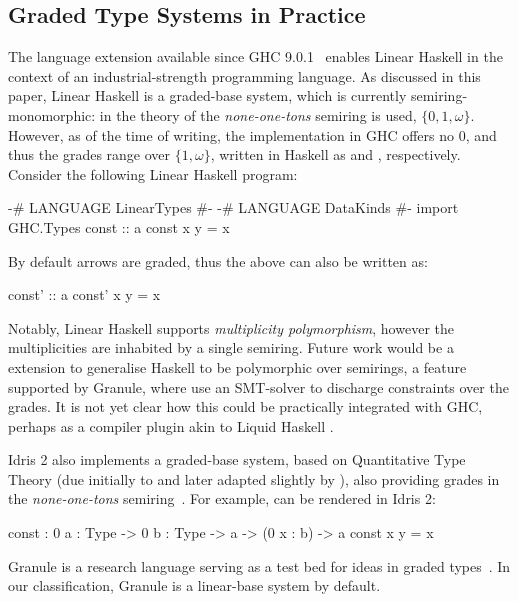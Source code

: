 \subsection{Graded Type Systems in Practice}
\label{sec:wild}
The  language extension available since GHC 9.0.1~\cite{GHCLinearTypes}
enables Linear Haskell in the context of an
industrial-strength programming language. As discussed in this paper, Linear Haskell is a graded-base system, which is currently semiring-monomorphic: in the theory
of \citet{DBLP:journals/pacmpl/BernardyBNJS18} the \textit{none-one-tons} semiring is used,
$\{0, 1, \omega\}$. However, as of the time of writing,
the implementation in GHC offers no $0$, and
thus the grades range over $\{1, \omega\}$, written in Haskell as  and , respectively.
Consider the following Linear Haskell program:
%
\begin{haskell}
{-# LANGUAGE LinearTypes #-}
{-# LANGUAGE DataKinds #-}
import GHC.Types
const :: a %
const x y = x
\end{haskell}
%
By default arrows are  graded, thus the above can also be written
as:
%
\begin{haskell}[firstnumber=last]
const' :: a %
const' x y = x
\end{haskell}
%
Notably, Linear Haskell supports \textit{multiplicity polymorphism}, however the multiplicities
are inhabited by a single semiring.
Future work would be a  extension to generalise Haskell to be polymorphic over
semirings, a feature supported by Granule, where \citet{DBLP:journals/pacmpl/OrchardLE19} use an
SMT-solver to discharge constraints over the grades. It is not yet clear how this could be
practically integrated with GHC, perhaps as a compiler plugin akin to Liquid Haskell \cite{Vazou2020LiquidHaskell}.

Idris 2 also implements a graded-base system, based on Quantitative
Type Theory (due initially to \citet{McBride2016} and later adapted
slightly by \citet{quantitative-type-theory}), also providing
grades in the \textit{none-one-tons} semiring~\cite{DBLP:conf/ecoop/Brady21,DBLP:journals/darts/Brady21}. For example,  can be rendered in Idris 2:
%
\begin{haskell}
const : {0 a : Type} -> {0 b : Type} -> a -> (0 x : b) -> a
const x y = x
\end{haskell}

Granule is a research language serving as a test bed for ideas
in graded types~\cite{DBLP:journals/pacmpl/OrchardLE19}. In our classification,
Granule is a linear-base system by default.

